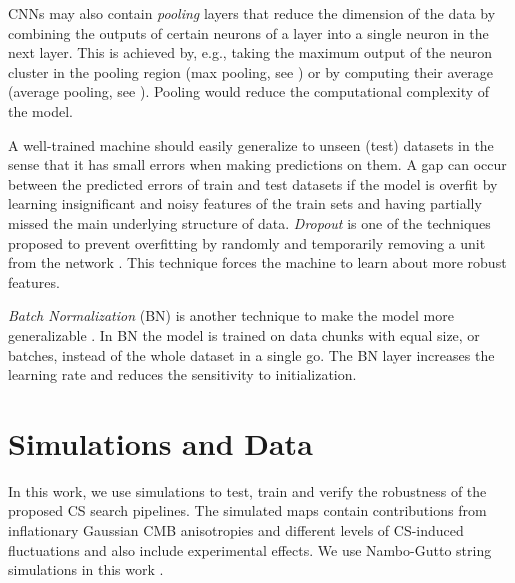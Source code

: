 \documentclass[fleqn,usenatbib]{mnras}
\begin{document}
CNNs may also contain {\it pooling} layers that reduce the dimension of the data by combining  the outputs of certain neurons of a layer into a single 
neuron in the next layer. 
This is achieved by, e.g., taking the maximum output of the neuron cluster in the pooling region (max pooling, see \cite{cir12}) or by computing their average (average pooling, see \cite{mit20}). 
Pooling would reduce the computational complexity of the model.  

A well-trained machine should easily generalize to unseen (test) datasets in the sense that it has small errors when making predictions on them. A gap can occur between the predicted errors of train and test datasets  if the model is overfit by learning insignificant and noisy  features of the train sets and having partially missed the main underlying structure of data. {\it Dropout} is one of the techniques proposed to prevent overfitting by randomly and temporarily removing  a unit from the network \cite{sri14}. This technique forces the machine to learn about more robust features.  

{\it Batch Normalization} (BN) is another technique to make the model more generalizable \citep{iof15}.
In BN the model is trained on data chunks with equal size, or batches, instead of the whole dataset in a single go. The BN layer increases the learning rate  and reduces the sensitivity to initialization. 
\section{Simulations and Data}
\label{sec:sim}
In this work, we use simulations to test, train and verify the robustness of the proposed CS search pipelines.
%
The simulated maps contain contributions from inflationary Gaussian CMB anisotropies and different levels of CS-induced fluctuations and also include experimental effects.
We use Nambo-Gutto string  simulations in this work \citep{bennett1990high,ringeval2007cosmological}.
% 
\end{document}
